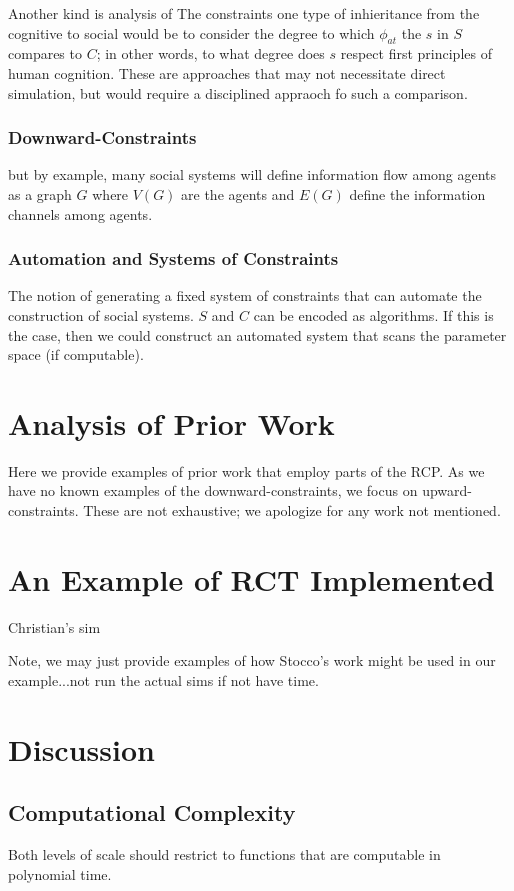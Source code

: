 \documentclass{article}
\begin{document}
Another kind is analysis of The constraints one type of inhieritance from the cognitive to social would be to consider the degree to which $\phi_{at}$ the $s$ in $S$ compares to $C$; in other words, to what degree does $s$ respect first principles of human cognition.  These are approaches that may not necessitate direct simulation, but would require a disciplined appraoch fo such a comparison. 

\subsubsection{Downward-Constraints}
but by example, many social systems will define information flow among agents as a graph $G$ where $V(G)$ are the agents and $E(G)$ define the information channels among agents. 


\subsubsection{Automation and Systems of Constraints}
The notion of generating a fixed system of constraints that can automate the construction of social systems.  $S$ and $C$ can be encoded as algorithms.  If this is the case, then we could construct an automated system that scans the parameter space (if computable).

\section{Analysis of Prior Work}
Here we provide examples of prior work that employ parts of the RCP.  As we have no known examples of the downward-constraints, we focus on upward-constraints.  These are not exhaustive; we apologize for any work not mentioned.  

\section{An Example of RCT Implemented}
Christian's sim

Note, we may just provide examples of how Stocco's work might be used in our example...not run the actual sims if not have time.

\section{Discussion}
\subsection{Computational Complexity}
Both levels of scale should restrict to functions that are computable in polynomial time.  
\end{document}
